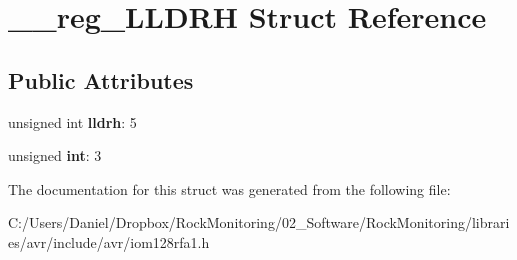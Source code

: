 \hypertarget{struct____reg___l_l_d_r_h}{}\section{\+\_\+\+\_\+reg\+\_\+\+L\+L\+D\+RH Struct Reference}
\label{struct____reg___l_l_d_r_h}
\subsection*{Public Attributes}
\begin{DoxyCompactItemize}
\item 
unsigned int {\bfseries lldrh}\+: 5\hypertarget{struct____reg___l_l_d_r_h_a48465a389a49e535d43205c647329d87}{}\label{struct____reg___l_l_d_r_h_a48465a389a49e535d43205c647329d87}

\item 
unsigned {\bfseries int}\+: 3\hypertarget{struct____reg___l_l_d_r_h_aae7fc519d954a5f4f6719aac53a423bb}{}\label{struct____reg___l_l_d_r_h_aae7fc519d954a5f4f6719aac53a423bb}

\end{DoxyCompactItemize}


The documentation for this struct was generated from the following file\+:\begin{DoxyCompactItemize}
\item 
C\+:/\+Users/\+Daniel/\+Dropbox/\+Rock\+Monitoring/02\+\_\+\+Software/\+Rock\+Monitoring/libraries/avr/include/avr/iom128rfa1.\+h\end{DoxyCompactItemize}
